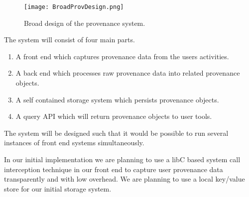 \begin{figure}
\texttt{[image: BroadProvDesign.png]}
\label{fig:broaddes}
\caption{Broad design of the provenance system.}
\end{figure}
The system will consist of four main parts.
\begin{enumerate}
\item A front end which captures provenance data from the users activities.
\item A back end which processes raw provenance data into related provenance objects.
\item A self contained storage system which persists provenance objects.
\item A query API which will return provenance objects to user tools.
\end{enumerate}
The system will be designed such that it would be possible to run several instances of front end systems simultaneously.

In our initial implementation we are planning to use a libC based system call interception technique in our front end to capture user provenance data transparently and with low overhead. We are planning to use a local key/value store for our initial storage system.

